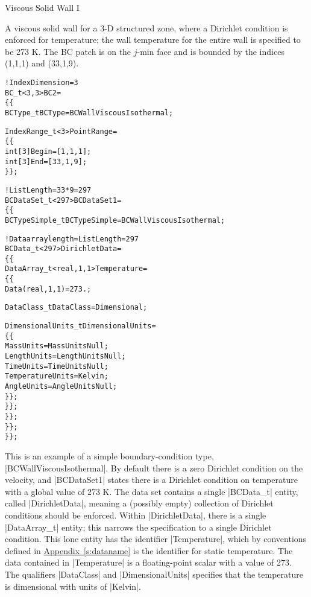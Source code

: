 \begin{example}{Viscous Solid Wall I}
\label{ex:bc2}

A viscous solid wall for a 3-D structured zone, where a Dirichlet
condition is enforced for temperature; the wall temperature for the
entire wall is specified to be 273 K.
The BC patch is on the $j$-min face and is bounded by the indices
(1,1,1) and (33,1,9).
\begin{alltt}
  !  IndexDimension = 3
  BC\_t<3,3> BC2 =
    \{\{
    BCType\_t BCType = BCWallViscousIsothermal ;

    IndexRange\_t<3> PointRange =
      \{\{
      int[3] Begin = [1 ,1,1] ;
      int[3] End   = [33,1,9] ;
      \}\} ;

    !  ListLength = 33*9 = 297
    BCDataSet\_t<297> BCDataSet1 =
      \{\{
      BCTypeSimple\_t BCTypeSimple = BCWallViscousIsothermal ;

      !  Data array length = ListLength = 297
      BCData\_t<297> DirichletData =
        \{\{
        DataArray\_t<real, 1, 1> Temperature =
          \{\{
          Data(real, 1, 1) = 273. ;
          
          DataClass\_t DataClass = Dimensional ;

          DimensionalUnits\_t DimensionalUnits = 
            \{\{
            MassUnits        = MassUnitsNull ;
            LengthUnits      = LengthUnitsNull ;
            TimeUnits        = TimeUnitsNull ;
            TemperatureUnits = Kelvin ;
            AngleUnits       = AngleUnitsNull ;
            \}\} ;
          \}\} ;
        \}\} ;
      \}\} ;
    \}\} ;
\end{alltt}

This is an example of a simple boundary-condition type,
|BCWallViscousIsothermal|.
By default there is a zero Dirichlet condition on the velocity, and
|BCDataSet1| states there is a Dirichlet condition on temperature with a
global value of 273 K.
The data set contains a single |BCData_t| entity, called
|DirichletData|, meaning a (possibly empty) collection of Dirichlet
conditions should be enforced.
Within |DirichletData|, there is a single |DataArray_t| entity; this
narrows the specification to a single Dirichlet condition.
This lone entity has the identifier |Temperature|, which by conventions
defined in \hyperref[s:dataname]{Appendix~\ref*{s:dataname}} is the
identifier for static temperature.
The data contained in |Temperature| is a floating-point scalar with a
value of 273.
The qualifiers |DataClass| and |DimensionalUnits| specifies that the
temperature is dimensional with units of |Kelvin|.


\end{example}
